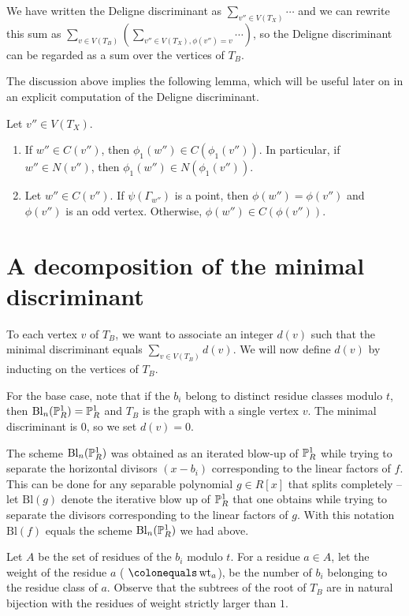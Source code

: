 We have written the Deligne discriminant as $\sum_{v'' \in V(T_X)} \cdots$ and we can rewrite this sum as $\sum_{v \in V(T_B)} (\sum_{v'' \in V(T_X), \phi(v'') = v} \cdots)$, so the Deligne discriminant can be regarded as a sum over the vertices of $T_B$.

The discussion above implies the following lemma, which will be useful later on in an explicit computation of the Deligne discriminant.  
\begin{lemma}\label{adjacency}
Let $v'' \in V(T_X)$. 
\begin{enumerate}[\upshape (a)]
 \item If $w'' \in C(v'')$, then $\phi_1(w'') \in C(\phi_1(v''))$. In particular, if $w'' \in N(v'')$, then $\phi_1(w'') \in N(\phi_1(v''))$.
 \item Let $w'' \in C(v'')$. If $\psi(\Gamma_{w''})$ is a point, then $\phi(w'') = \phi(v'')$ and $\phi(v'')$ is an odd vertex. Otherwise, $\phi(w'') \in C(\phi(v''))$.
\end{enumerate}
\end{lemma}

\section{A decomposition of the minimal discriminant}\label{breakupnaive}
To each vertex $v$ of $T_B$, we want to associate an integer $d(v)$ such that the minimal discriminant equals $\sum_{v \in V(T_B)} d(v)$. We will now define $d(v)$ by inducting on the vertices of $T_B$. 

For the base case, note that if the $b_i $ belong to distinct residue classes modulo $t$, then $\mathrm{Bl}_n(\P^1_R) = \P^1_R$ and $T_B$ is the graph with a single vertex $v$. The minimal discriminant is $0$, so we set $d(v) = 0$.

The scheme $\mathrm{Bl}_n(\P^1_R)$ was obtained as an iterated blow-up of $\P^1_R$ while trying to separate the horizontal divisors $(x-b_i)$ corresponding to the linear factors of $f$. This can be done for any separable polynomial $g \in R[x]$ that splits completely -- let $\mathrm{Bl}(g)$ denote the iterative blow up of $\P^1_R$ that one obtains while trying to separate the divisors corresponding to the linear factors of $g$. With this notation $\mathrm{Bl}(f)$ equals the scheme $\mathrm{Bl}_n(\P^1_R)$ we had above. 

Let $A$ be the set of residues of the $b_i$ modulo $t$. For a residue $a \in A$, let the weight of the residue $a$ ( $\colonequals \wt_a$), be the number of $b_i$ belonging to the residue class of $a$. Observe that the subtrees of the root of $T_B$ are in natural bijection with the residues of weight strictly larger than $1$. 

